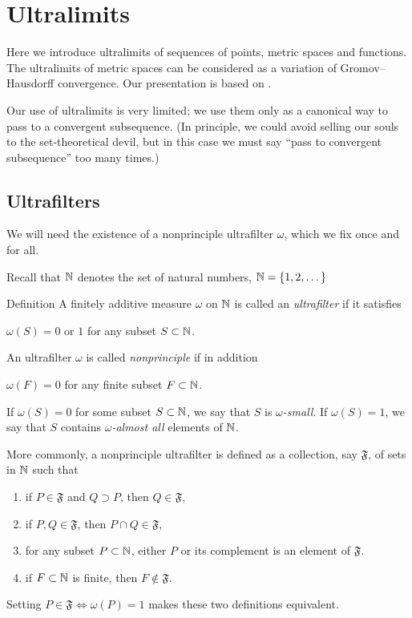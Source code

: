 \chapter{Ultralimits}

Here we introduce ultralimits of sequences of points, metric spaces and functions.
The ultralimits of metric spaces can be considered as a variation of Gromov--Hausdorff convergence.
Our presentation is based on \cite{kleiner-leeb}.

Our use of ultralimits is very limited; 
we use them only as a canonical way to pass to a convergent subsequence.
(In principle, we could avoid selling our souls 
to the set-theoretical devil, but in this case we must say ``pass to convergent subsequence'' too many times.)

\section{Ultrafilters}

We will need the existence of a nonprinciple  ultrafilter $\omega$,
which we fix once and for all.

Recall that $\mathbb{N}$ denotes the set of natural numbers, $\mathbb{N}=\{1,2,\dots\}$

\begin{thm}{Definition}
A finitely additive measure $\omega$ 
on  $\mathbb{N}$ 
is called an \emph{ultrafilter} if it satisfies 
\begin{subthm}{}
$\omega(S)=0$ or $1$ for any subset $S\subset \mathbb{N}$.
\end{subthm}
An ultrafilter $\omega$ is called 
\emph{nonprinciple} if in addition 
\begin{subthm}{}
$\omega(F)=0$ for any finite subset $F\subset \mathbb{N}$.
\end{subthm}
\end{thm}

If $\omega(S)=0$ for some subset $S\subset \mathbb{N}$,
we say that $S$ is \emph{$\omega$-small}. 
If $\omega(S)=1$, we say that $S$ contains \emph{$\omega$-almost all} elements of $\mathbb{N}$.

More commonly, a nonprinciple ultrafilter is defined as a collection, say $\mathfrak{F}$, of sets in $\mathbb{N}$ such that
\begin{enumerate}
\item\label{filter:supset} if $P\in \mathfrak{F}$ and $Q\supset P$, then $Q\in \mathfrak{F}$,
\item\label{filter:cap} if $P, Q\in \mathfrak{F}$, then $P\cap Q\in \mathfrak{F}$,
\item\label{filter:ultra} for any subset $P\subset\mathbb{N}$, either $P$ or its complement is an element of $\mathfrak{F}$.
\item\label{filter:non-prin} if $F\subset \mathbb{N} $ is finite, then $F\notin \mathfrak{F}$.
\end{enumerate}
Setting $P\in\mathfrak{F}\Leftrightarrow\omega(P)=1$ makes these two definitions equivalent.

